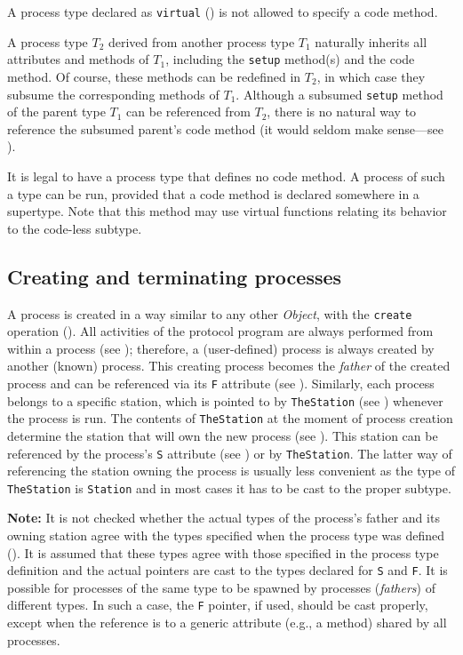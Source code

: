 A process type declared as {\tt virtual} () is not allowed to
specify a code method.

\medskip

A process type $T_2$ derived from another
process type $T_1$ naturally inherits all
attributes and methods of $T_1$, including the {\tt setup} method(s)
and the code method.
Of course, these methods can be redefined in $T_2$, in which case they
subsume the corresponding methods of $T_1$.
Although a subsumed
{\tt setup} method of the parent type $T_1$ can be referenced
from $T_2$, there is no natural way to reference the subsumed parent's code
method (it would seldom make sense---see ).

It is legal to have a process type that defines no code method.
A process of such a type can be run,
provided that a code method is declared somewhere in a supertype.
Note that this method may use virtual functions relating its behavior
to the code-less subtype.

\subsection{Creating and terminating processes}
\label{rm_pr_ct}

A process is created in a way similar to any other {\em Object}, with the
{\tt create} operation ().
All activities of the protocol program are always performed from
within a process (see ); therefore, a (user-defined)
process is always created by another (known) process.
This creating process becomes the {\em father\/} of the created process
and can be referenced via its {\tt F} attribute (see ).
Similarly, each process belongs to a specific station, which is pointed to
by {\tt TheStation} (see ) whenever the process is run.
The contents of {\tt TheStation} at the moment of process creation
determine the station that will own the new process (see ).
This station can be referenced by the process's {\tt S} attribute
(see ) or by {\tt TheStation}.
The latter way of referencing the station owning the process is usually less
convenient as the type of {\tt TheStation} is {\tt Station} and in most
cases it has to be cast to the proper subtype.

\medskip

\noindent
{\bf Note:} It is not checked whether the actual types of the process's
father and its owning station agree with the types specified when the
process type was defined ().
It is assumed that these types agree with those specified in the
process type definition and the actual pointers are cast to the types
declared for {\tt S} and {\tt F}.
It is possible for processes of the same type to be spawned by processes
({\em fathers\/}) of different types.
In such a case, the {\tt F} pointer, if used, should be cast properly, except
when the reference is to a generic attribute (e.g., a method)
shared by all processes.

